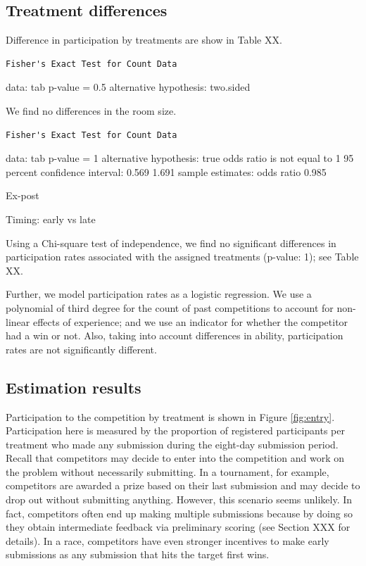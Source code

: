 \documentclass[12pt,]{article}
\begin{document}
\subsection{Treatment differences}\label{treatment-differences}

Difference in participation by treatments are show in Table XX.

\begin{verbatim}
Fisher's Exact Test for Count Data
\end{verbatim}

data: tab p-value = 0.5 alternative hypothesis: two.sided

We find no differences in the room size.

\begin{verbatim}
Fisher's Exact Test for Count Data
\end{verbatim}

data: tab p-value = 1 alternative hypothesis: true odds ratio is not
equal to 1 95 percent confidence interval: 0.569 1.691 sample estimates:
odds ratio 0.985

Ex-post

Timing: early vs late

Using a Chi-square test of independence, we find no significant
differences in participation rates associated with the assigned
treatments (p-value: 1); see Table XX.

Further, we model participation rates as a logistic regression. We use a
polynomial of third degree for the count of past competitions to account
for non-linear effects of experience; and we use an indicator for
whether the competitor had a win or not. Also, taking into account
differences in ability, participation rates are not significantly
different.

\subsection{Estimation results}\label{estimation-results}

Participation to the competition by treatment is shown in Figure
\ref{fig:entry}. Participation here is measured by the proportion of
registered participants per treatment who made any submission during the
eight-day submission period. Recall that competitors may decide to enter
into the competition and work on the problem without necessarily
submitting. In a tournament, for example, competitors are awarded a
prize based on their last submission and may decide to drop out without
submitting anything. However, this scenario seems unlikely. In fact,
competitors often end up making multiple submissions because by doing so
they obtain intermediate feedback via preliminary scoring (see Section
XXX for details). In a race, competitors have even stronger incentives
to make early submissions as any submission that hits the target first
wins.
\end{document}
